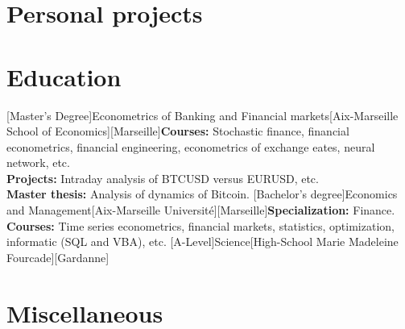 \documentclass[a4paper]{arthur-cv-en}
\begin{document}
\begin{textblock}{20.5}
\begin{minipage}[t]{0.61\textwidth}
    \section{Personal projects}
      \begin{rightenv}
      \end{rightenv}

    \section{Education}
      \begin{rightenv}
        [Master's Degree]{Econometrics of Banking and Financial markets}[Aix-Marseille School of Economics][Marseille]{\textbf{Courses:} Stochastic finance, financial econometrics, financial engineering, econometrics of exchange eates, neural network, etc.\\\textbf{Projects:} Intraday analysis of BTCUSD versus EURUSD, etc.\\\textbf{Master thesis:} Analysis of dynamics of Bitcoin.}
        [Bachelor's degree]{Economics and Management}[Aix-Marseille Université][Marseille]{\textbf{Specialization:} Finance.\\\textbf{Courses:} Time series econometrics, financial markets, statistics, optimization, informatic (SQL and VBA), etc.}
        [A-Level]{Science}[High-School Marie Madeleine Fourcade][Gardanne]{}
      \end{rightenv}

    \section{Miscellaneous}
      \begin{rightenv}
      \end{rightenv}

  \end{minipage}

\end{textblock}
\end{document}
